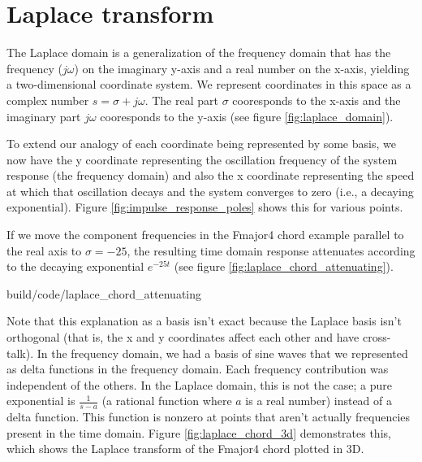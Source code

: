 \section{Laplace transform}

The Laplace domain is a generalization of the frequency domain that has the
frequency ($j\omega$) on the imaginary y-axis and a real number on the x-axis,
yielding a two-dimensional coordinate system. We represent coordinates in this
space as a complex number $s = \sigma + j\omega$. The real part $\sigma$
cooresponds to the x-axis and the imaginary part $j\omega$ cooresponds to the
y-axis (see figure \ref{fig:laplace_domain}).

\begin{bookfigure}

  \caption{Laplace domain}
  \label{fig:laplace_domain}
\end{bookfigure}

To extend our analogy of each coordinate being represented by some basis, we now
have the y coordinate representing the oscillation frequency of the
\gls{system response} (the frequency domain) and also the x coordinate
representing the speed at which that oscillation decays and the \gls{system}
converges to zero (i.e., a decaying exponential). Figure
\ref{fig:impulse_response_poles} shows this for various points.

If we move the component frequencies in the Fmajor4 chord example parallel to
the real axis to $\sigma = -25$, the resulting time domain response attenuates
according to the decaying exponential $e^{-25t}$ (see figure
\ref{fig:laplace_chord_attenuating}).

\begin{svg}{build/code/laplace_chord_attenuating}
  \caption{Fmajor4 chord at $\sigma = 0$ and $\sigma = -25$}
  \label{fig:laplace_chord_attenuating}
\end{svg}

Note that this explanation as a basis isn't exact because the Laplace basis
isn't orthogonal (that is, the x and y coordinates affect each other and have
cross-talk). In the frequency domain, we had a basis of sine waves that we
represented as delta functions in the frequency domain. Each frequency
contribution was independent of the others. In the Laplace domain, this is not
the case; a pure exponential is $\frac{1}{s - a}$ (a rational function where $a$
is a real number) instead of a delta function. This function is nonzero at
points that aren't actually frequencies present in the time domain. Figure
\ref{fig:laplace_chord_3d} demonstrates this, which shows the Laplace transform
of the Fmajor4 chord plotted in 3D.


